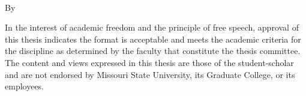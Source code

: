 \begin{center}
\doublespacing
    \textbf{\thesistitle}\\
    \bigskip
    By\\
    \bigskip
    \thesisstudent
\end{center}

\vspace{1in}

\begin{center}
\end{center}

\begin{center}
    \thesisdate
\end{center}

\vspace*{\fill}

\hspace*{\fill}

 \bigskip
\bigskip
\noindent
{\footnotesize In the interest of academic freedom and the principle of free speech, approval of this thesis indicates the format is acceptable and meets the academic criteria for the discipline as determined by the faculty that constitute the thesis committee. The content and views expressed in this thesis are those of the student-scholar and are not endorsed by Missouri State University, its Graduate College, or its employees.}
